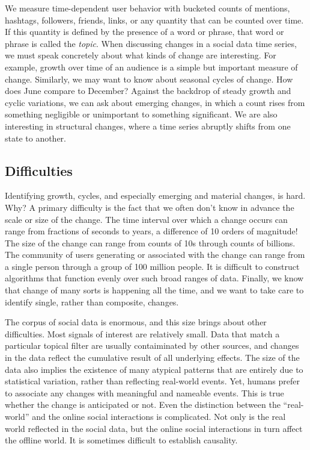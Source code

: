 \documentclass{article}
\begin{document}
We measure time-dependent user behavior with bucketed counts of mentions,
hashtags, followers, friends, links, or any quantity that can be counted
over time. If this quantity is defined by the presence of a word or
phrase, that word or phrase is called the \textit{topic}. When discussing changes
in a social data time series, we must speak concretely about what kinds of
change are interesting. For example, growth over
time of an audience is a simple but important measure of change. Similarly, we
may want to know about seasonal cycles of change. How does June compare to
December? Against the backdrop of steady growth and cyclic variations, we can
ask about emerging changes, in which a count rises from something negligible or
unimportant to something significant. We are also interesting in structural
changes, where a time series abruptly shifts from one state to another.

\subsection{Difficulties}
Identifying growth, cycles, and especially emerging and material changes, is
hard. Why? A primary difficulty is the fact that we often don’t know in advance
the scale or size of the change. The time interval over which a change occurs
can range from fractions of seconds to years, a difference of 10 orders of
magnitude! The size of the change can range from counts of 10s through counts
of billions. The community of users generating or associated with the change
can range from a single person through a group of 100 million people. It is
difficult to construct algorithms that function evenly over such broad ranges
of data. Finally, we know that change of many sorts is happening all the time,
and we want to take care to identify single, rather than composite, changes.

The corpus of social data is enormous, and this size brings about
other difficulties. Most signals of interest are relatively
small.
Data that match a particular topical filter are usually contaiminated
by other sources, and changes in the data reflect the cumulative result
of all underlying effects. 
The size of the data also implies the existence of many
atypical patterns that are entirely due to statistical variation, rather than
reflecting real-world events. Yet, humans prefer to associate any changes with
meaningful and nameable events. This is true whether the change is anticipated
or not. Even the distinction between the “real-world” and the online social
interactions is complicated. Not only is the real world reflected in the social
data, but the online social interactions in turn affect the offline world.
It is sometimes difficult to establish causality.  
\end{document}
